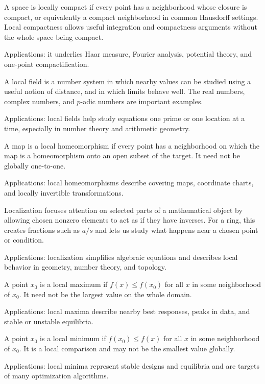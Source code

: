 A space is locally compact if every point has a neighborhood whose closure is compact, or equivalently a compact neighborhood in common Hausdorff settings. Local compactness allows useful integration and compactness arguments without the whole space being compact. \par\noindent Applications: it underlies Haar measure, Fourier analysis, potential theory, and one-point compactification.

A local field is a number system in which nearby values can be studied using a useful notion of distance, and in which limits behave well. The real numbers, complex numbers, and $p$-adic numbers are important examples. \par\noindent Applications: local fields help study equations one prime or one location at a time, especially in number theory and arithmetic geometry.

A map is a local homeomorphism if every point has a neighborhood on which the map is a homeomorphism onto an open subset of the target. It need not be globally one-to-one. \par\noindent Applications: local homeomorphisms describe covering maps, coordinate charts, and locally invertible transformations.

Localization focuses attention on selected parts of a mathematical object by allowing chosen nonzero elements to act as if they have inverses. For a ring, this creates fractions such as $a/s$ and lets us study what happens near a chosen point or condition. \par\noindent Applications: localization simplifies algebraic equations and describes local behavior in geometry, number theory, and topology.

A point $x_0$ is a local maximum if $f(x)\leq f(x_0)$ for all $x$ in some neighborhood of $x_0$. It need not be the largest value on the whole domain. \par\noindent Applications: local maxima describe nearby best responses, peaks in data, and stable or unstable equilibria.

A point $x_0$ is a local minimum if $f(x_0)\leq f(x)$ for all $x$ in some neighborhood of $x_0$. It is a local comparison and may not be the smallest value globally. \par\noindent Applications: local minima represent stable designs and equilibria and are targets of many optimization algorithms.

